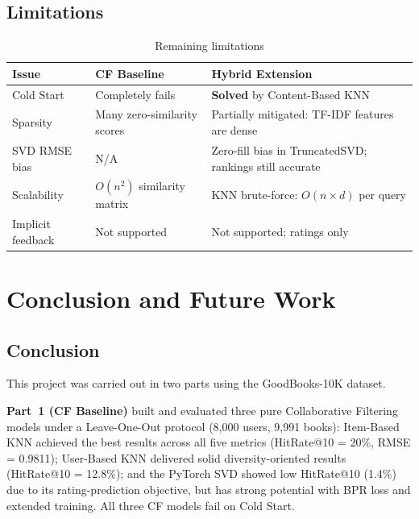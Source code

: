 \documentclass[12pt, a4paper]{article}
\begin{document}
\subsection{Limitations}

\begin{table}[H]
  \centering
  \caption{Remaining limitations}
  \label{tab:limitations}
  \begin{tabular}{|p{2.5cm}|p{4.8cm}|p{4.5cm}|}
    \hline
    \textbf{Issue} & \textbf{CF Baseline} & \textbf{Hybrid Extension} \\
    \hline
    Cold Start & Completely fails & \textbf{Solved} by Content-Based KNN \\
    \hline
    Sparsity & Many zero-similarity scores & Partially mitigated: TF-IDF features are dense \\
    \hline
    SVD RMSE bias & N/A & Zero-fill bias in TruncatedSVD; rankings still accurate \\
    \hline
    Scalability & $O(n^2)$ similarity matrix & KNN brute-force: $O(n \times d)$ per query \\
    \hline
    Implicit feedback & Not supported & Not supported; ratings only \\
    \hline
  \end{tabular}
\end{table}

\newpage
\section{Conclusion and Future Work}
\label{sec:conclusion}

\subsection{Conclusion}

This project was carried out in two parts using the GoodBooks-10K dataset.

\textbf{Part~1 (CF Baseline)} built and evaluated three pure Collaborative Filtering models
under a Leave-One-Out protocol (8,000 users, 9,991 books):
Item-Based KNN achieved the best results across all five metrics (HitRate@10 = 20\%, RMSE = 0.9811);
User-Based KNN delivered solid diversity-oriented results (HitRate@10 = 12.8\%);
and the PyTorch SVD showed low HitRate@10 (1.4\%) due to its rating-prediction objective,
but has strong potential with BPR loss and extended training.
All three CF models fail on Cold Start.
\end{document}
